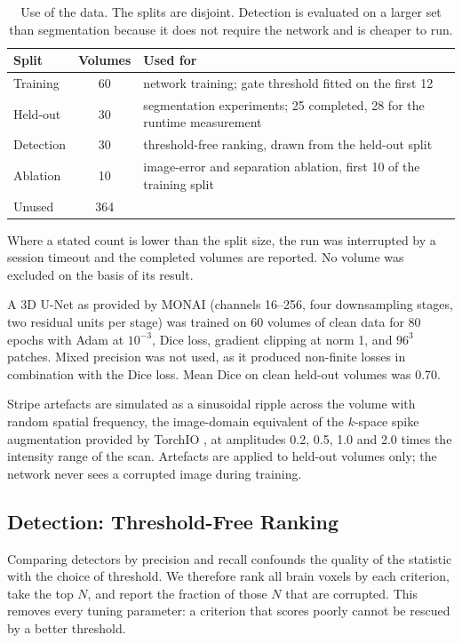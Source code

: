 \documentclass[12pt]{article}
\theoremstyle{definition}
\theoremstyle{plain}
\begin{document}
\begin{table}[H]
\centering
\caption{Use of the data. The splits are disjoint. Detection is evaluated on a larger
set than segmentation because it does not require the network and is cheaper to run.}
\begin{tabular}{lcl}
\toprule
Split & Volumes & Used for \\
\midrule
Training & 60 & network training; gate threshold fitted on the first 12 \\
Held-out & 30 & segmentation experiments; 25 completed, 28 for the runtime measurement \\
Detection & 30 & threshold-free ranking, drawn from the held-out split \\
Ablation & 10 & image-error and separation ablation, first 10 of the training split \\
Unused & 364 & \\
\bottomrule
\end{tabular}
\end{table}

Where a stated count is lower than the split size, the run was interrupted by a
session timeout and the completed volumes are reported. No volume was excluded on the
basis of its result.

A 3D U-Net \cite{ronneberger2015} as provided by MONAI (channels 16--256, four
downsampling stages, two residual units per stage) was trained on 60 volumes of clean
data for 80 epochs with Adam at $10^{-3}$, Dice loss, gradient clipping at norm 1, and
$96^3$ patches. Mixed precision was not used, as it produced non-finite losses in
combination with the Dice loss. Mean Dice on clean held-out volumes was 0.70.

Stripe artefacts are simulated as a sinusoidal ripple across the volume with random
spatial frequency, the image-domain equivalent of the $k$-space spike augmentation
provided by TorchIO \cite{perezgarcia2021torchio}, at amplitudes 0.2, 0.5, 1.0 and 2.0 times the intensity range of
the scan. Artefacts are applied to held-out volumes only; the network never sees a
corrupted image during training.

\subsection{Detection: Threshold-Free Ranking}

Comparing detectors by precision and recall confounds the quality of the statistic
with the choice of threshold. We therefore rank all brain voxels by each criterion,
take the top $N$, and report the fraction of those $N$ that are corrupted. This
removes every tuning parameter: a criterion that scores poorly cannot be rescued by a
better threshold.
\end{document}
